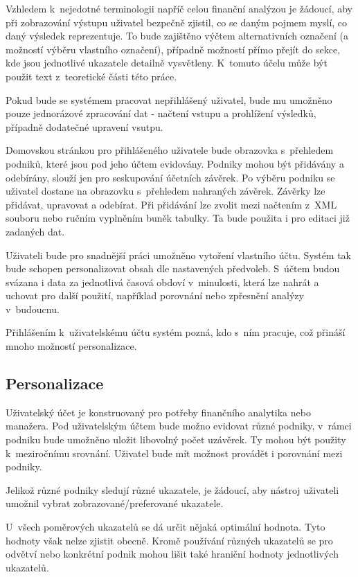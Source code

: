 Vzhledem k~nejedotné terminologii napříč celou finanční analýzou je žádoucí, aby při zobrazování výstupu uživatel bezpečně zjistil, co se daným pojmem myslí, co daný výsledek reprezentuje. To bude zajištěno výčtem alternativních označení (a možností výběru vlastního označení), případně možností přímo přejít do sekce, kde jsou jednotlivé ukazatele detailně vysvětleny. K~tomuto účelu může být použit text z~teoretické části této práce.

Pokud bude se systémem pracovat nepřihlášený uživatel, bude mu umožněno pouze jednorázové zpracování dat - načtení vstupu a prohlížení výsledků, případně dodatečné upravení vsutpu.

Domovskou stránkou pro přihlášeného uživatele bude obrazovka s~přehledem podniků, které jsou pod jeho účtem evidovány. Podniky mohou být přidávány a odebírány, slouží jen pro seskupování účetních závěrek.
Po výběru podniku se uživatel dostane na obrazovku s~přehledem nahraných závěrek. Závěrky lze přidávat, upravovat a odebírat. Při přidávání lze zvolit mezi načtením z~XML souboru nebo ručním vyplněním buněk tabulky. Ta bude použita i pro editaci již zadaných dat.  

Uživateli bude pro snadnější práci umožněno vytoření vlastního účtu. Systém tak bude schopen personalizovat obsah dle nastavených předvoleb. S~účtem budou svázana i data za jednotlivá časová obdoví v~minulosti, která lze nahrát a uchovat pro další použití, například porovnání nebo zpřesnění analýzy v~budoucnu.

Přihlášením k~uživatelskému účtu systém pozná, kdo s~ním pracuje, což přináší mnoho možností personalizace. 


\subsection{Personalizace}
Uživatelský účet je konstruovaný pro potřeby finančního analytika nebo manažera. Pod uživatelským účtem bude možno evidovat různé podniky, v~rámci podniku bude umožněno uložit libovolný počet uzávěrek. Ty mohou být použity k~meziročnímu srovnání.
Uživatel bude mít možnost provádět i porovnání mezi podniky.

Jelikož různé podniky sledují různé ukazatele, je žádoucí, aby nástroj uživateli umožnil vybrat zobrazované/preferované ukazatele. 

U~všech poměrových ukazatelů se dá určit nějaká optimální hodnota. Tyto hodnoty však nelze zjistit obecně. Kromě používání různých ukazatelů se pro odvětví nebo konkrétní podnik mohou lišit také hraniční hodnoty jednotlivých ukazatelů.


